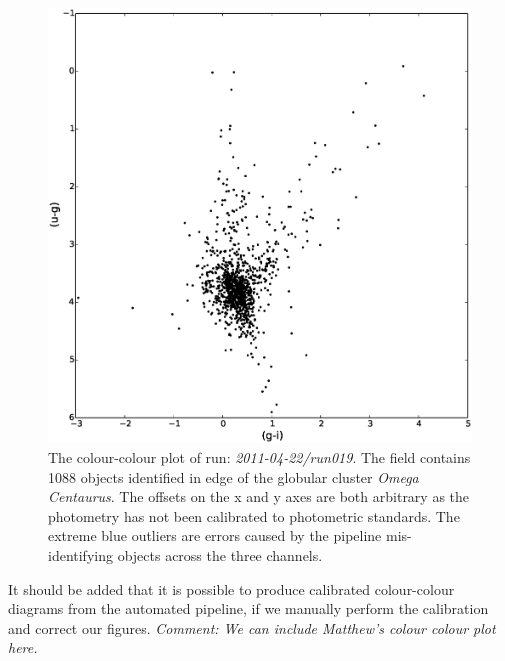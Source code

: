 \begin{figure}
\centering
\includegraphics[width=120mm]{images//2011-04-22-run019-omegacen-2colour.eps}
\caption{The colour-colour plot of run: \emph{2011-04-22/run019}. The field contains 1088 objects identified in edge of the globular cluster \emph{Omega Centaurus}. The offsets on the x and y axes are both arbitrary as the photometry has not been calibrated to photometric standards. The extreme blue outliers are errors caused by the pipeline mis-identifying objects across the three channels.}
\label{fig:differentialtrad}
\end{figure}

It should be added that it is possible to produce calibrated colour-colour diagrams from the automated pipeline, if we manually perform the calibration and correct our figures. \emph{Comment: We can include Matthew's colour colour plot here.} 
